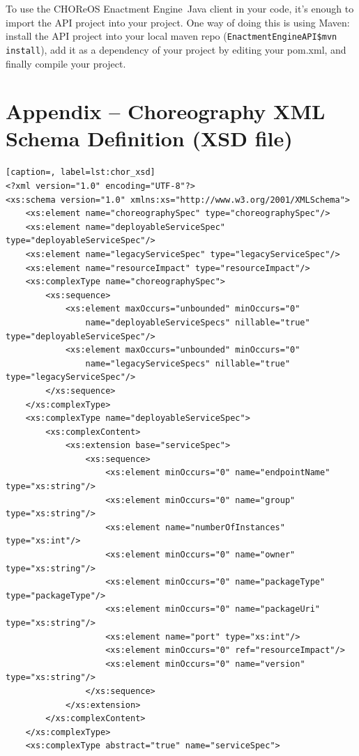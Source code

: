 \documentclass[a4paper, 10pt]{article}
\newcommand{\ee}{CHOReOS Enactment Engine}
\begin{document}
To use the \ee\ Java client in your code, it's enough to import the API project into your project. One way of doing this is using Maven: install the API project into your local maven repo (\texttt{EnactmentEngineAPI\$mvn install}), add it as a dependency of your project by editing your pom.xml, and finally compile your project.

\section*{Appendix -- Choreography XML Schema Definition (XSD file)}

{\footnotesize

\lstset{language=XML}

\begin{lstlisting}[caption=, label=lst:chor_xsd]
<?xml version="1.0" encoding="UTF-8"?>
<xs:schema version="1.0" xmlns:xs="http://www.w3.org/2001/XMLSchema">
    <xs:element name="choreographySpec" type="choreographySpec"/>
    <xs:element name="deployableServiceSpec" type="deployableServiceSpec"/>
    <xs:element name="legacyServiceSpec" type="legacyServiceSpec"/>
    <xs:element name="resourceImpact" type="resourceImpact"/>
    <xs:complexType name="choreographySpec">
        <xs:sequence>
            <xs:element maxOccurs="unbounded" minOccurs="0"
                name="deployableServiceSpecs" nillable="true" type="deployableServiceSpec"/>
            <xs:element maxOccurs="unbounded" minOccurs="0"
                name="legacyServiceSpecs" nillable="true" type="legacyServiceSpec"/>
        </xs:sequence>
    </xs:complexType>
    <xs:complexType name="deployableServiceSpec">
        <xs:complexContent>
            <xs:extension base="serviceSpec">
                <xs:sequence>
                    <xs:element minOccurs="0" name="endpointName" type="xs:string"/>
                    <xs:element minOccurs="0" name="group" type="xs:string"/>
                    <xs:element name="numberOfInstances" type="xs:int"/>
                    <xs:element minOccurs="0" name="owner" type="xs:string"/>
                    <xs:element minOccurs="0" name="packageType" type="packageType"/>
                    <xs:element minOccurs="0" name="packageUri" type="xs:string"/>
                    <xs:element name="port" type="xs:int"/>
                    <xs:element minOccurs="0" ref="resourceImpact"/>
                    <xs:element minOccurs="0" name="version" type="xs:string"/>
                </xs:sequence>
            </xs:extension>
        </xs:complexContent>
    </xs:complexType>
    <xs:complexType abstract="true" name="serviceSpec">

\end{lstlisting}}
\end{document}
